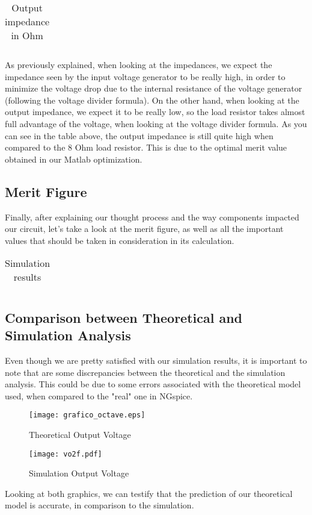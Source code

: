 \begin{table}[H]
\centering
\begin{tabularx}{0.6\textwidth} {
  | >{\raggedright\arraybackslash}X
  | >{\raggedleft\arraybackslash}X | }
 \hline

\end{tabularx}
\caption{Output impedance in Ohm}
\end{table}
As previously explained, when looking at the impedances, we expect the impedance seen by the input voltage generator to be really high, in order to minimize the voltage drop due to the internal resistance of the voltage generator (following the voltage divider formula). On the other hand, when looking at the output impedance, we expect it to be really low, so the load resistor takes almost full advantage of the voltage, when looking at the voltage divider formula. As you can see in the table above, the output impedance is still quite high when compared to the 8 Ohm load resistor. This is due to the optimal merit value obtained in our Matlab optimization.



\subsection{Merit Figure}

Finally, after explaining our thought process and the way components impacted our circuit, let's take a look at the merit figure, as well as all the important values that should be taken in consideration in its calculation.

\begin{table}[H]
\centering
\begin{tabularx}{0.6\textwidth} {
  | >{\raggedright\arraybackslash}X
  | >{\raggedleft\arraybackslash}X | }
 \hline

\end{tabularx}
\caption{Simulation results}
\end{table}
\subsection{Comparison between Theoretical and Simulation Analysis}

Even though we are pretty satisfied with our simulation results, it is important to note that are some discrepancies between the theoretical and the simulation analysis. This could be due to some errors associated with the theoretical model used, when compared to the "real" one in NGspice.

\begin{figure}[H]\centering
\texttt{[image: grafico\_octave.eps]}
\caption{Theoretical Output Voltage}
\label{fig:snat}
\end{figure}


\begin{figure}[H]\centering
\texttt{[image: vo2f.pdf]}
\caption{Simulation Output Voltage}
\label{fig:snat}
\end{figure}

Looking at both graphics, we can testify that the prediction of our theoretical model is accurate, in comparison to the simulation.
